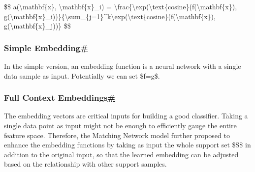 \$\$ a(\textbackslash mathbf\{x\}, \textbackslash mathbf\{x\}\_i) = \textbackslash frac\{\textbackslash exp(\textbackslash text\{cosine\}(f(\textbackslash mathbf\{x\}), g(\textbackslash mathbf\{x\}\_i))\}\{\textbackslash sum\_\{j=1\}\^{}k\textbackslash exp(\textbackslash text\{cosine\}(f(\textbackslash mathbf\{x\}), g(\textbackslash mathbf\{x\}\_j))\} \$\$

\subsubsection{\texorpdfstring{Simple Embedding\hyperref[simple-embedding]{\#}}{Simple Embedding\#}}\label{simple-embedding}

In the simple version, an embedding function is a neural network with a single data sample as input. Potentially we can set \$f=g\$.

\subsubsection{\texorpdfstring{Full Context Embeddings\hyperref[full-context-embeddings]{\#}}{Full Context Embeddings\#}}\label{full-context-embeddings}

The embedding vectors are critical inputs for building a good classifier. Taking a single data point as input might not be enough to efficiently gauge the entire feature space. Therefore, the Matching Network model further proposed to enhance the embedding functions by taking as input the whole support set \$S\$ in addition to the original input, so that the learned embedding can be adjusted based on the relationship with other support samples.

